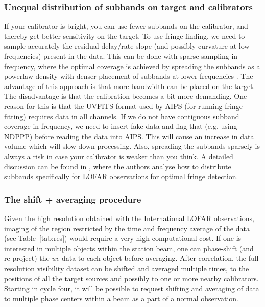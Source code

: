 \documentclass[graybox]{svmult}
\begin{document}
\subsubsection{Unequal distribution of subbands on target and calibrators} 
If your calibrator is bright, you can use fewer subbands on the calibrator, and
thereby get better sensitivity on the target. To use fringe finding, we need to
sample accurately the residual delay/rate slope (and possibly curvature at low
frequencies) present in the data. This can be done with sparse sampling in
frequency, where the optimal coverage is achieved by spreading the subbands as
a powerlaw density with denser placement of subbands at lower frequencies
\citep{marti-vidal10}. The advantage of this approach is that more bandwidth
can be placed on the target.  The disadvantage is that the calibration becomes
a bit more demanding. One reason for this is that the UVFITS format used by
AIPS (for running fringe fitting) requires data in all channels.  If we do not
have contiguous subband coverage in frequency, we need to insert fake data and
flag that (e.g. using NDPPP) before reading the data into AIPS.  This will
cause an increase in data volume which will slow down processing.  Also,
spreading the subbands sparsely is always a risk in case your calibrator is
weaker than you think. A detailed discussion can be found in
\cite{marti-vidal10}, where the authors analyse how to distribute subbands
specifically for LOFAR observations for optimal fringe detection.

\subsubsection{The shift + averaging procedure}\label{sect:shift}
Given the high resolution obtained with the
International LOFAR observations, imaging of the region restricted by the time
and frequency average of the data (see Table~\ref{tab:res}) would require a
very high computational cost. If one is interested in multiple objects within
the station beam, one can phase-shift (and re-project) the $uv$-data to each
object before averaging.  After correlation, the full-resolution visibility
dataset can be shifted and averaged multiple times, to the positions of all the
target sources and possibly to one or more nearby calibrators. Starting in
cycle four, it will be possible to request shifting and averaging of data to
multiple phase centers within a beam as a part of a normal observation.
\end{document}
